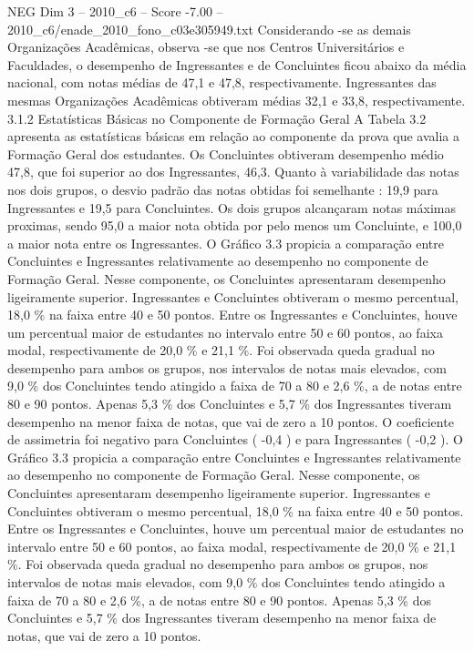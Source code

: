 \begin{textsample}{NEG Dim 3 – 2010\_c6 – Score -7.00 – 2010\_c6/enade\_2010\_fono\_c03e305949.txt}
Considerando -se as demais Organizações Acadêmicas, observa -se que nos Centros Universitários e Faculdades, o desempenho de Ingressantes e de Concluintes ficou abaixo da média nacional, com notas médias de 47,1 e 47,8, respectivamente.
Ingressantes das mesmas Organizações Acadêmicas obtiveram médias 32,1 e 33,8, respectivamente. 3.1.2 Estatísticas Básicas no Componente de Formação Geral A Tabela 3.2 apresenta as estatísticas básicas em relação ao componente da prova que avalia a Formação Geral dos estudantes.
Os Concluintes obtiveram desempenho médio 47,8, que foi superior ao dos Ingressantes, 46,3.
Quanto à variabilidade das notas nos dois grupos, o desvio padrão das notas obtidas foi semelhante : 19,9 para Ingressantes e 19,5 para Concluintes.
Os dois grupos alcançaram notas máximas proximas, sendo 95,0 a maior nota obtida por pelo menos um Concluinte, e 100,0 a maior nota entre os Ingressantes.
O Gráfico 3.3 propicia a comparação entre Concluintes e Ingressantes relativamente ao desempenho no componente de Formação Geral.
Nesse componente, os Concluintes apresentaram desempenho ligeiramente superior.
Ingressantes e Concluintes obtiveram o mesmo percentual, 18,0 \% na faixa entre 40 e 50 pontos.
Entre os Ingressantes e Concluintes, houve um percentual maior de estudantes no intervalo entre 50 e 60 pontos, ao faixa modal, respectivamente de 20,0 \% e 21,1 \%.
Foi observada queda gradual no desempenho para ambos os grupos, nos intervalos de notas mais elevados, com 9,0 \% dos Concluintes tendo atingido a faixa de 70 a 80 e 2,6 \%, a de notas entre 80 e 90 pontos.
Apenas 5,3 \% dos Concluintes e 5,7 \% dos Ingressantes tiveram desempenho na menor faixa de notas, que vai de zero a 10 pontos.
O coeficiente de assimetria foi negativo para Concluintes ( -0,4 ) e para Ingressantes ( -0,2 ).
O Gráfico 3.3 propicia a comparação entre Concluintes e Ingressantes relativamente ao desempenho no componente de Formação Geral.
Nesse componente, os Concluintes apresentaram desempenho ligeiramente superior.
Ingressantes e Concluintes obtiveram o mesmo percentual, 18,0 \% na faixa entre 40 e 50 pontos.
Entre os Ingressantes e Concluintes, houve um percentual maior de estudantes no intervalo entre 50 e 60 pontos, ao faixa modal, respectivamente de 20,0 \% e 21,1 \%.
Foi observada queda gradual no desempenho para ambos os grupos, nos intervalos de notas mais elevados, com 9,0 \% dos Concluintes tendo atingido a faixa de 70 a 80 e 2,6 \%, a de notas entre 80 e 90 pontos.
Apenas 5,3 \% dos Concluintes e 5,7 \% dos Ingressantes tiveram desempenho na menor faixa de notas, que vai de zero a 10 pontos.

\end{textsample}
